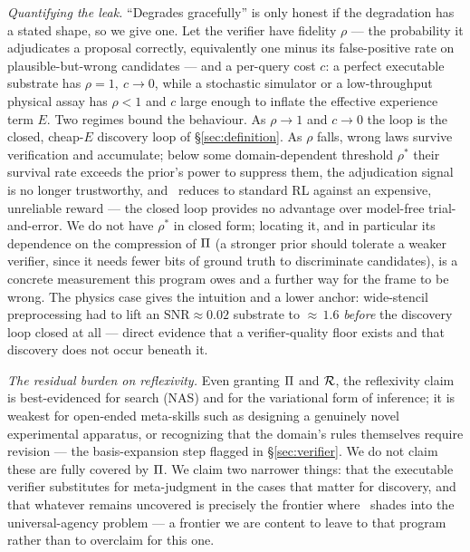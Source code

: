 \emph{Quantifying the leak.} ``Degrades gracefully'' is only honest if the degradation has a stated shape, so we give one. Let the verifier have fidelity $\rho$ --- the probability it adjudicates a proposal correctly, equivalently one minus its false-positive rate on plausible-but-wrong candidates --- and a per-query cost $c$: a perfect executable substrate has $\rho = 1,\ c \to 0$, while a stochastic simulator or a low-throughput physical assay has $\rho < 1$ and $c$ large enough to inflate the effective experience term $E$. Two regimes bound the behaviour. As $\rho \to 1$ and $c \to 0$ the loop is the closed, cheap-$E$ discovery loop of \S\ref{sec:definition}. As $\rho$ falls, wrong laws survive verification and accumulate; below some domain-dependent threshold $\rho^\ast$ their survival rate exceeds the prior's power to suppress them, the adjudication signal is no longer trustworthy, and \DCI\ reduces to standard RL against an expensive, unreliable reward --- the closed loop provides no advantage over model-free trial-and-error. We do not have $\rho^\ast$ in closed form; locating it, and in particular its dependence on the compression of $\Pi$ (a stronger prior should tolerate a weaker verifier, since it needs fewer bits of ground truth to discriminate candidates), is a concrete measurement this program owes and a further way for the frame to be wrong. The physics case gives the intuition and a lower anchor: wide-stencil preprocessing had to lift an $\mathrm{SNR}\approx 0.02$ substrate to ${\approx}\,1.6$ \citep{frasch2026b} \emph{before} the discovery loop closed at all --- direct evidence that a verifier-quality floor exists and that discovery does not occur beneath it.

\emph{The residual burden on reflexivity.} Even granting $\Pi$ and $\mathcal{R}$, the reflexivity claim is best-evidenced for search (NAS) and for the variational form of inference; it is weakest for open-ended meta-skills such as designing a genuinely novel experimental apparatus, or recognizing that the domain's rules themselves require revision --- the basis-expansion step flagged in \S\ref{sec:verifier}. We do not claim these are fully covered by $\Pi$. We claim two narrower things: that the executable verifier substitutes for meta-judgment in the cases that matter for discovery, and that whatever remains uncovered is precisely the frontier where \DCI\ shades into the universal-agency problem --- a frontier we are content to leave to that program rather than to overclaim for this one.
